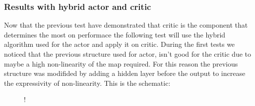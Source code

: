 \subsubsection{Results with hybrid actor and critic}
Now that the previous test have demonstrated that critic is the component that determines the most on performace the following test will use the hybrid algorithm used for the actor and apply it on critic. During the first tests we noticed that the previous structure used for actor, isn't good for the critic due to maybe a high non-linearity of the map required. For this reason the previous structure was modifided by adding a hidden layer before the output to increase the expressivity of non-linearity. This is the schematic:
\begin{figure}[!h]
	\centering
	 {!} {
	}
\end{figure}

